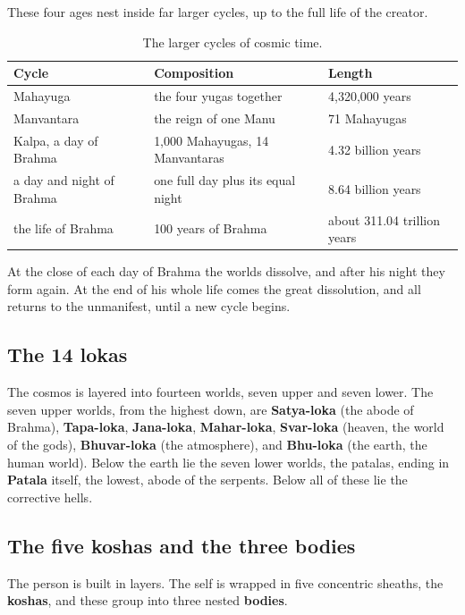 These four ages nest inside far larger cycles, up to the full life of the creator.

\begin{longtable}{@{} L{0.26\textwidth}L{0.32\textwidth}L{0.30\textwidth}@{}}
\caption{The larger cycles of cosmic time.}\\
\toprule
\textbf{Cycle} & \textbf{Composition} & \textbf{Length} \\
\midrule
Mahayuga & the four yugas together & 4,320,000 years \\
Manvantara & the reign of one Manu & 71 Mahayugas \\
Kalpa, a day of Brahma & 1,000 Mahayugas, 14 Manvantaras & 4.32 billion years \\
a day and night of Brahma & one full day plus its equal night & 8.64 billion years \\
the life of Brahma & 100 years of Brahma & about 311.04 trillion years \\
\bottomrule
\end{longtable}

At the close of each day of Brahma the worlds dissolve, and after his night they form again. At the end of his whole life comes the great dissolution, and all returns to the unmanifest, until a new cycle begins.

\subsection{The 14 lokas}

The cosmos is layered into fourteen worlds, seven upper and seven lower. The seven upper worlds, from the highest down, are \textbf{Satya-loka} (the abode of Brahma), \textbf{Tapa-loka}, \textbf{Jana-loka}, \textbf{Mahar-loka}, \textbf{Svar-loka} (heaven, the world of the gods), \textbf{Bhuvar-loka} (the atmosphere), and \textbf{Bhu-loka} (the earth, the human world). Below the earth lie the seven lower worlds, the patalas, ending in \textbf{Patala} itself, the lowest, abode of the serpents. Below all of these lie the corrective hells.

\subsection{The five koshas and the three bodies}

The person is built in layers. The self is wrapped in five concentric sheaths, the \textbf{koshas}, and these group into three nested \textbf{bodies}.

